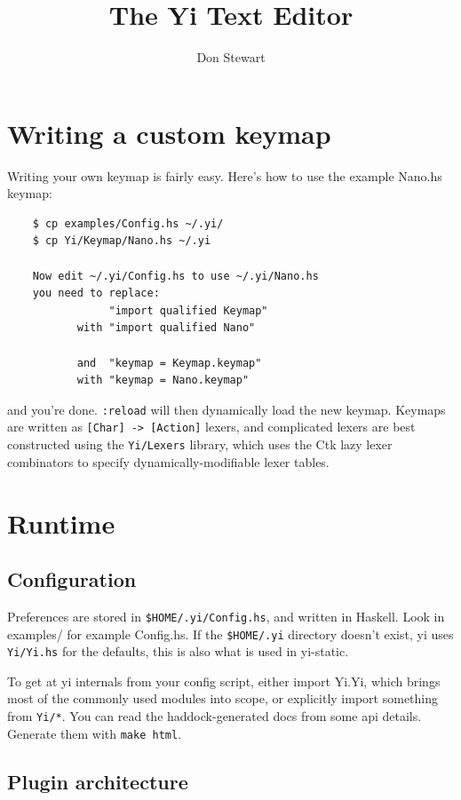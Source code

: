 \documentclass[]{article}
\title{The Yi Text Editor}
\author{Don Stewart}
\newcommand{\code}[1]{\texttt{#1}}
\begin{document}
\maketitle

\section{Writing a custom keymap}

Writing your own keymap is fairly easy. Here's how to use the example
Nano.hs keymap:
\begin{verbatim}
    $ cp examples/Config.hs ~/.yi/
    $ cp Yi/Keymap/Nano.hs ~/.yi

    Now edit ~/.yi/Config.hs to use ~/.yi/Nano.hs
    you need to replace:
                "import qualified Keymap" 
           with "import qualified Nano"

           and  "keymap = Keymap.keymap"
           with "keymap = Nano.keymap"
\end{verbatim}

and you're done. \texttt{:reload} will then dynamically load the new
keymap. Keymaps are written as \code{[Char] -> [Action]} lexers, and
complicated lexers are best constructed using the \code{Yi/Lexers}
library, which uses the Ctk lazy lexer combinators to specify
dynamically-modifiable lexer tables.

\section{Runtime}

\subsection{Configuration}

Preferences are stored in \code{\$HOME/.yi/Config.hs}, and written in
Haskell. Look in examples/ for example Config.hs. If the
\code{\$HOME/.yi} directory doesn't exist, yi uses \code{Yi/Yi.hs} for
the defaults, this is also what is used in yi-static.

To get at yi internals from your config script, either import Yi.Yi,
which brings most of the commonly used modules into scope, or explicitly
import something from \code{Yi/*}. You can read the haddock-generated
docs from some api details. Generate them with \code{make html}.

\subsection{Plugin architecture}
\end{document}
